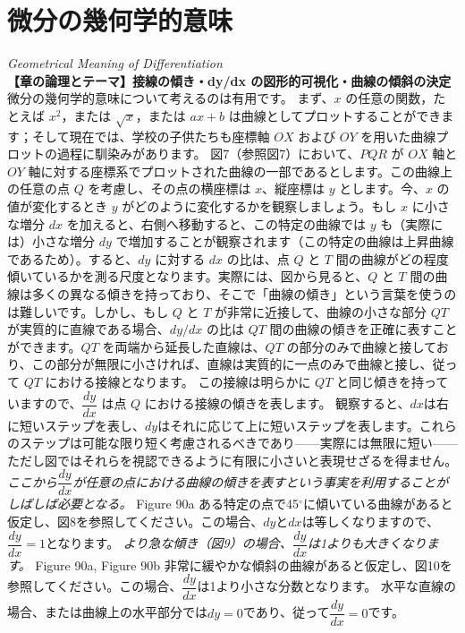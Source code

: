 \documentclass[a4paper,11pt,openany]{ltjsbook}
\begin{document}
\chapter{微分の幾何学的意味}
\noindent\textit{\large Geometrical Meaning of Differentiation}\\[2mm]
\noindent\textbf{\small 【章の論理とテーマ】接線の傾き・dy/dx の図形的可視化・曲線の傾斜の決定}\\[4mm]
微分の幾何学的意味について考えるのは有用です。
まず、$x$ の任意の関数，たとえば $x^2$，または $\sqrt{x}$，または $ax+b$ は曲線としてプロットすることができます；そして現在では、学校の子供たちも座標軸 $OX$ および $OY$ を用いた曲線プロットの過程に馴染みがあります。
図7（参照図7）において、$PQR$ が $OX$ 軸と $OY$ 軸に対する座標系でプロットされた曲線の一部であるとします。この曲線上の任意の点 $Q$ を考慮し、その点の横座標は $x$、縦座標は $y$ とします。今、$x$ の値が変化するとき $y$ がどのように変化するかを観察しましょう。もし $x$ に小さな増分 $dx$ を加えると、右側へ移動すると、この特定の曲線では $y$ も（実際には）小さな増分 $dy$ で増加することが観察されます（この特定の曲線は上昇曲線であるため）。すると、$dy$ に対する $dx$ の比は、点 $Q$ と $T$ 間の曲線がどの程度傾いているかを測る尺度となります。実際には、図から見ると、$Q$ と $T$ 間の曲線は多くの異なる傾きを持っており、そこで「曲線の傾き」という言葉を使うのは難しいです。しかし、もし $Q$ と $T$ が非常に近接して、曲線の小さな部分 $QT$ が実質的に直線である場合、$dy/dx$ の比は $QT$ 間の曲線の傾きを正確に表すことができます。$QT$ を両端から延長した直線は、$QT$ の部分のみで曲線と接しており、この部分が無限に小さければ、直線は実質的に一点のみで曲線と接し、従って $QT$ における接線となります。
この接線は明らかに $QT$ と同じ傾きを持っていますので、$\dfrac{dy}{dx}$ は点 $Q$ における接線の傾きを表します。
観察すると、$dx$は右に短いステップを表し、$dy$はそれに応じて上に短いステップを表します。これらのステップは可能な限り短く考慮されるべきであり——実際には無限に短い——ただし図ではそれらを視認できるように有限に小さいと表現せざるを得ません。
\textit{ここから$\dfrac{dy}{dx}$が任意の点における曲線の傾きを表すという事実を利用することがしばしば必要となる。}
Figure 90a
ある特定の点で45$^\circ$に傾いている曲線があると仮定し、図8を参照してください。この場合、$dy$と$dx$は等しくなりますので、$\dfrac{dy}{dx} = 1$となります。
\textit{より急な傾き（図9）の場合、$\dfrac{dy}{dx}$は1よりも大きくなります。}
Figure 90a, Figure 90b
非常に緩やかな傾斜の曲線があると仮定し、図10を参照してください。この場合、$\dfrac{dy}{dx}$は1より小さな分数となります。
水平な直線の場合、または曲線上の水平部分では$dy=0$であり、従って$\dfrac{dy}{dx}=0$です。
\end{document}

